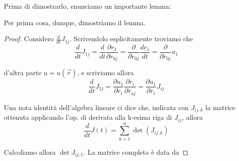 \documentclass{report}
\begin{document}
Prima di dimostrarlo, enunciamo un importante lemma: 


Per prima cosa, dunque, dimostriamo il lemma. 

\begin{proof}
    Considero $\frac{d}{dt}J_{1j}$. Scrivendolo esplicitamente troviamo che
    \begin{equation}
        \frac{d}{dt}J_{1j} = \frac{d}{dt}\frac{\partial r_1}{\partial r_{0j}} = \frac{\partial}{\partial r_{0j}}\frac{dr_1}{dt} = \frac{\partial}{\partial r_{0j}}u_1 
    \end{equation}

    d'altra parte $u=u(\vec{r})$, e scriviamo allora 
    \begin{equation}
        \frac{d}{dt}J_{1j} = \frac{\partial u_1}{\partial r_i}\frac{\partial r_i}{\partial r_{oj}} = \frac{\partial u_1}{\partial r_i}J_{ij}
    \end{equation}

    Una nota identità dell'algebra lineare ci dice che, indicata con $J_{ij, k}$ la matrice ottenuta applicando l'op. di derivata alla k-esima riga di $J_{ij}$, allora 
    \begin{equation}
        \frac{d}{dt}J(t) = \sum^n_{k=1} \det(J_{ij, k})
    \end{equation}

    Calcoliamo allora $\det{J_{ij, 1}}$. La matrice completa è data da 


\end{proof}
\end{document}

